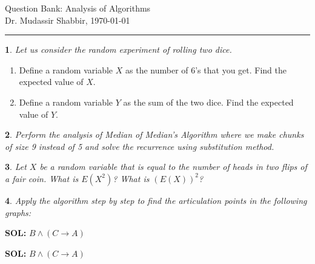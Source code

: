 \documentclass[%
addpoints]{exam}
\theoremstyle{problem}
\newtheorem{p}{}
\begin{document}
 \pagestyle{empty}
 \begin{FlushLeft}
Question Bank: Analysis of Algorithms\\Dr. Mudassir Shabbir,
\today
\end{FlushLeft}

	
\thispagestyle{myheadings}
\rule{500pt}{1.5pt}
\begin{p}
Let us consider the random experiment of rolling two dice.
\hfill \end{p}
\begin{enumerate}
    \item Define a random variable \(X\) as the number of 6's that you get. Find the expected value of \(X\).
    \item Define a random variable \(Y\) as the sum of the two dice. Find the expected value of \(Y\).
\end{enumerate}

\begin{p}
Perform the analysis of Median of Median's Algorithm where we make chunks of size 9 instead of 5 and solve the recurrence using substitution method.
\hfill \end{p}

\begin{p}
Let \( X \) be a random variable that is equal to the number of heads in two flips of a  
fair coin. What is \( E(X^2) \)? What is \( (E(X))^2 \)?
\hfill \end{p}

\begin{p}
Apply the algorithm step by step to find the articulation points in the following graphs:
\end{p}

\begin{center}
\end{center}
\ifanswers
{\bf SOL:}  $B\wedge (C\to A)$
\vfill
\fi

\ifanswers
{\bf SOL:}  $B\wedge (C\to A)$
\vfill
\fi
\begin{center}
\end{center}
\end{document}
